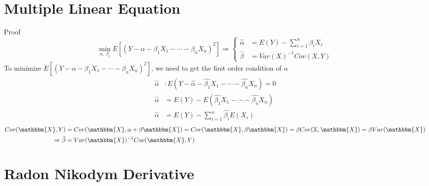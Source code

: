 \documentclass[12pt]{article}
\begin{document}
 

\rhead{\today}
\section{Multiple Linear Equation}
Proof
\[
    \min_{\alpha,\ \beta_i} E[(Y-\alpha-\beta_1 X_1 - \cdots - \beta_n X_n)^2]\Rightarrow \begin{cases}
        \hat{\alpha} & = E(Y) - \sum_{i=1}^n \beta_i X_i\\
        \hat{\beta} & = Var(X)^{-1}Cov(X,Y)
    \end{cases}  
\]
To minimize $E[(Y-\alpha-\beta_1 X_1 - \cdots - \beta_n X_n)^2]$, we need to get the first order condition of $\alpha$
\begin{align*}
    \hat{\alpha} & : E(Y-\hat{\alpha} - \hat{\beta_1} X_1 -\cdots - \hat{\beta_n} X_n) = 0\\
    \hat{\alpha} & = E(Y) - E(\hat{\beta_1} X_1 - \cdots - \hat{\beta_n} X_n) \\
    \hat{\alpha} & = E(Y) - \sum_{i=1}^n \hat{\beta_i} E(X_i)
\end{align*}
\begin{align*}
    Cov(\mathbbm{X},Y) &= Cov(\mathbbm{X}, \alpha+\beta \mathbbm{X}) = Cov(\mathbbm{X}, \beta \mathbbm{X}) = \beta Cov(\mathbb{X}, \mathbbm{X}) = \beta Var(\mathbbm{X})\\
    \Rightarrow \hat{\beta} &= Var(\mathbbm{X})^{-1}Cov(\mathbbm{X}, Y)
\end{align*}
\section{Radon Nikodym Derivative}
\end{document}
